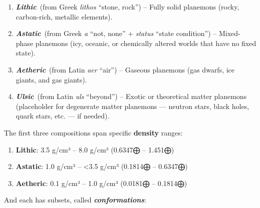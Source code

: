 \documentclass[
  letterpaper,
]{book}
\providecommand{\tightlist}{%
  \setlength{\itemsep}{0pt}\setlength{\parskip}{0pt}}
\begin{document}
\begin{enumerate}
\def\labelenumi{\arabic{enumi}.}
\tightlist
\item
  \textbf{\emph{Lithic}}~(from Greek \emph{lithos} ``stone, rock'') --
  Fully solid planemons (rocky, carbon-rich, metallic elements).
\item
  \textbf{\emph{Astatic}}~(from Greek \emph{a} ``not, none'' +
  \emph{status} ``state condition'') -- Mixed-phase planemons (icy,
  oceanic, or chemically altered worlds that have no fixed state).
\item
  \textbf{\emph{Aetheric}}~(from Latin \emph{aer} ``air'') -- Gaseous
  planemons (gas dwarfs, ice giants, and gas giants).
\item
  \textbf{\emph{Ulsic}}~(from Latin \emph{uls} ``beyond'') -- Exotic or
  theoretical matter planemons (placeholder for degenerate matter
  planemons --- neutron stars, black holes, quark stars, etc. --- if
  needed).
\end{enumerate}

The first three compositions span specific \textbf{density} ranges:

\begin{enumerate}
\def\labelenumi{\arabic{enumi}.}
\tightlist
\item
  \textbf{Lithic}: 3.5 g/cm³ -- 8.0 g/cm³ (0.6347⨁ -- 1.451⨁)
\item
  \textbf{Astatic}: 1.0 g/cm³ -- \textless3.5 g/cm³ (0.1814⨁ -- 0.6347⨁)
\item
  \textbf{Aetheric}: 0.1 g/cm³ -- 1.0 g/cm³ (0.0181⨁ -- 0.1814⨁)
\end{enumerate}

And each has subsets, called \textbf{\emph{conformations}}:
\end{document}
